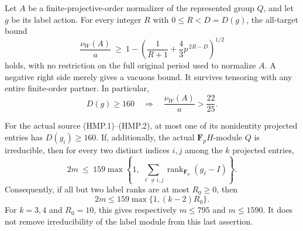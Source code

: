 \begin{theorem}[D-TD61]
Let $A$ be a finite-projective-order normalizer of the represented
group $Q$, and let $g$ be its label action.  For every integer
$R$ with $0\le R<D=D(g)$, the all-target bound
\[
 \frac{\nu_W(A)}a\ \ge\
  1-\left(\frac1{R+1}+\frac43p^{\,2R-D}\right)^{1/2}
 \tag{HMP.4}
\]
holds, with no restriction on the full original period used to
normalize $A$.  A negative right side merely gives a vacuous bound.
It survives tensoring with any entire finite-order partner.
In particular,
\[
               D(g)\ge160
          \quad\Longrightarrow\quad
                    \frac{\nu_W(A)}a>\frac{22}{25}.
 \tag{HMP.5}
\]

For the actual source (HMP.1)--(HMP.2), at most one of its
nonidentity projected entries has $D(g_i)\ge160$.
If, additionally, the actual $\mathbf F_pH$-module $Q$ is
irreducible, then for every two distinct indices $i,j$ among
the $k$ projected entries,
\[
 2m\ \le\
 159\max\left\{1,\ \sum_{\ell\ne i,j}
                             \operatorname{rank}_{\mathbf F_p}(g_\ell-I)
       \right\}.
 \tag{HMP.6}
\]
Consequently, if all but two label ranks are at most $R_0\ge0$, then
\[
          2m\le159\max\{1,(k-2)R_0\}.
 \tag{HMP.7}
\]
For $k=3,4$ and $R_0=10$, this gives respectively $m\le795$
and $m\le1590$.  It does not remove irreducibility of the label
module from this last assertion.
\end{theorem}

